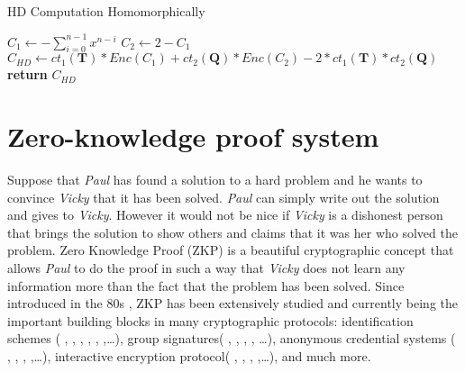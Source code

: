 \begin{algorithm}
\caption{HD Computation Homomorphically}\label{alg:EvalDistance}
\begin{algorithmic}[1]
\State $C_1 \gets - \sum_{i=0}^{n-1}x^{n-i}$
\State $C_2 \gets 2 - C_1$
\State $C_{HD} \gets ct_1(\mathbf{T})*Enc(C_1) + ct_2(\mathbf{Q})*
Enc(C_2) - 2*ct_1(\mathbf{T})*ct_2(\mathbf{Q})$
\State \textbf{return} $C_{HD}$
\EndProcedure
\end{algorithmic}
\end{algorithm}



\section{Zero-knowledge proof system}
\label{sec:introzkp}
Suppose that \emph{Paul} has found a solution
to a hard problem and he wants to convince \emph{Vicky} that it has
been solved. \emph{Paul} can simply write out the solution and gives
to \emph{Vicky}. However it would not be nice if \emph{Vicky} is a
dishonest person that brings the solution to show others and claims that
it was her who solved the problem. Zero Knowledge Proof (ZKP) is a
beautiful cryptographic concept that allows \emph{Paul} to do the proof
in such a way that \emph{Vicky} does not learn any information more
than the fact that the problem has been solved. Since introduced
in the 80s \cite{goldwasser1989knowledge}, ZKP has been extensively
studied and currently being the important building blocks in many cryptographic
protocols: identification schemes ( \cite{fiat1986prove}, \cite{feige1988zero},
\cite{guillou1990paradoxical}, \cite{schnorr1991efficient},
\cite{stern1993new}, \cite{kawachi2008concurrently},\dots), group signatures(
\cite{camenisch1997efficient}, \cite{ateniese2000practical},
\cite{boneh2004short}, \cite{boneh2004group}, \cite{groth2007fully}\dots),
anonymous credential systems ( \cite{camenisch2008efficient},
\cite{camenisch2001efficient}, \cite{belenkiy2009randomizable},
\cite{chase2013malleable},\dots), interactive encryption protocol(
\cite{galil1985symmetric}, \cite{goldreich2009foundations},
\cite{goldwasser2005proof}, \cite{katz2003efficient},\dots), and much more.




